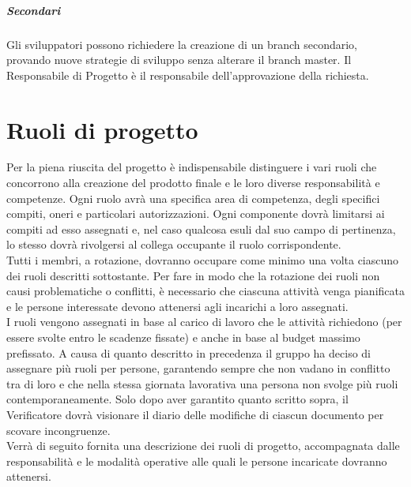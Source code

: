 \subparagraph{Secondari}
\label{4.4.2}
Gli sviluppatori possono richiedere la creazione di un branch secondario, provando nuove strategie di sviluppo senza alterare il branch master. Il Responsabile di Progetto è il responsabile dell'approvazione della richiesta.

\newpage




\newpage
\section{Ruoli di progetto}%
\label{2}
Per la piena riuscita del progetto è indispensabile distinguere i vari ruoli che concorrono alla creazione del prodotto finale e le loro diverse responsabilità e competenze.
Ogni ruolo avrà una specifica area di competenza, degli specifici compiti, oneri e particolari autorizzazioni. Ogni componente dovrà limitarsi ai compiti ad esso assegnati e, nel caso qualcosa esuli dal suo campo di pertinenza, lo stesso dovrà rivolgersi al collega occupante il ruolo corrispondente.\\
Tutti i membri, a rotazione, dovranno occupare come minimo una volta ciascuno dei ruoli descritti sottostante. Per fare in modo che la rotazione dei ruoli non causi problematiche o conflitti, è necessario che ciascuna attività venga pianificata e le persone interessate devono attenersi agli incarichi a loro assegnati.\\
I ruoli vengono assegnati in base al carico di lavoro che le attività richiedono (per essere svolte entro le scadenze fissate) e anche in base al budget massimo prefissato. A causa di quanto descritto in precedenza il gruppo ha deciso di assegnare più ruoli per persone, garantendo sempre che non vadano in conflitto tra di loro e che nella stessa giornata lavorativa una persona non svolge più ruoli contemporaneamente.
Solo dopo aver garantito quanto scritto sopra, il Verificatore dovrà visionare il diario delle modifiche di ciascun documento per scovare incongruenze.\\
Verrà di seguito fornita una descrizione dei ruoli di progetto, accompagnata dalle responsabilità e le modalità operative alle quali le persone incaricate dovranno attenersi.

